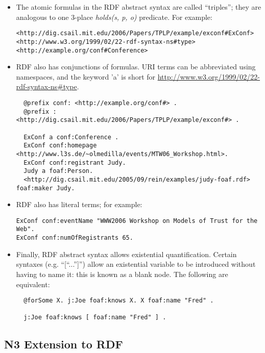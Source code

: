 \documentclass{tlp}
\begin{document}
\begin{itemize}

\item{}The atomic formulas in the RDF abstract syntax are called
  ``triples''; they are analogous to one 3-place {\it holds(s, p, o)}
  predicate. For example:

\begin{verbatim}
<http://dig.csail.mit.edu/2006/Papers/TPLP/example/exconf#ExConf>
<http://www.w3.org/1999/02/22-rdf-syntax-ns#type> <http://example.org/conf#Conference>
\end{verbatim}

 \item{}RDF also has conjunctions of formulas. URI terms can be
   abbreviated using namespaces, and the keyword 'a' is short for
   \url{http://www.w3.org/1999/02/22-rdf-syntax-ns#type}.

\begin{verbatim}
  @prefix conf: <http://example.org/conf#> .
  @prefix : <http://dig.csail.mit.edu/2006/Papers/TPLP/example/exconf#> .

  ExConf a conf:Conference .
  ExConf conf:homepage <http://www.l3s.de/~olmedilla/events/MTW06_Workshop.html>.
  ExConf conf:registrant Judy.
  Judy a foaf:Person.
  <http://dig.csail.mit.edu/2005/09/rein/examples/judy-foaf.rdf> foaf:maker Judy.
\end{verbatim}

\item{}RDF also has literal terms; for example:

\begin{verbatim}
ExConf conf:eventName "WWW2006 Workshop on Models of Trust for the Web".
ExConf conf:numOfRegistrants 65.
\end{verbatim}

\item{} Finally, RDF abstract syntax allows existential
  quantification.  Certain syntaxes (e.g. ``[``...'']'') allow an
  existential variable to be introduced without having to name it:
  this is known as a blank node. The following are equivalent:

\begin{verbatim}
  @forSome X. j:Joe foaf:knows X. X foaf:name "Fred" .

  j:Joe foaf:knows [ foaf:name "Fred" ] .
\end{verbatim}


\end{itemize}


\subsection{N3 Extension to RDF}
\end{document}
